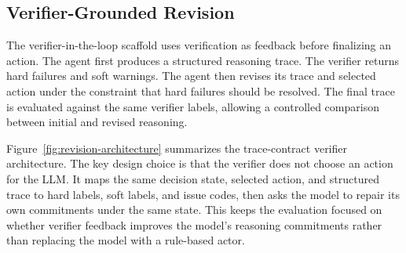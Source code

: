 \documentclass[sigconf,anonymous,review]{acmart}
\begin{document}
\subsection{Verifier-Grounded Revision}

The verifier-in-the-loop scaffold uses verification as feedback before finalizing an action. The agent first produces a structured reasoning trace. The verifier returns hard failures and soft warnings. The agent then revises its trace and selected action under the constraint that hard failures should be resolved. The final trace is evaluated against the same verifier labels, allowing a controlled comparison between initial and revised reasoning.

Figure~\ref{fig:revision-architecture} summarizes the trace-contract verifier architecture. The key design choice is that the verifier does not choose an action for the LLM. It maps the same decision state, selected action, and structured trace to hard labels, soft labels, and issue codes, then asks the model to repair its own commitments under the same state. This keeps the evaluation focused on whether verifier feedback improves the model's reasoning commitments rather than replacing the model with a rule-based actor.
\end{document}
